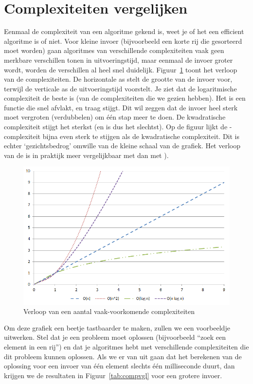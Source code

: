 \section{Complexiteiten vergelijken}

Eenmaal de complexiteit van een algoritme gekend is, weet je of het een efficient algoritme is of niet. Voor kleine invoer (bijvoorbeeld een korte rij die gesorteerd moet worden) gaan algoritmes van verschillende complexiteiten vaak geen merkbare verschillen tonen in uitvoeringstijd, maar eenmaal de invoer groter wordt, worden de verschillen al heel snel duidelijk. Figuur~\ref{fig:complexities} toont het verloop van de complexiteiten. De horizontale as stelt de grootte van de invoer voor, terwijl de verticale as de uitvoeringstijd voorstelt. Je ziet dat de logaritmische complexiteit de beste is (van de complexiteiten die we gezien hebben). Het is een functie die snel afvlakt, en traag stijgt. Dit wil zeggen dat de invoer heel sterk moet vergroten (verdubbelen) om \'e\'en stap meer te doen. De kwadratische complexiteit stijgt het sterkst (en is dus het slechtst). Op de figuur lijkt de \compnln-complexiteit bijna even sterk te stijgen als de kwadratische complexiteit. Dit is echter `gezichtsbedrog' omwille van de kleine schaal van de grafiek. Het verloop van de \compnln is in praktijk meer vergelijkbaar met \compn dan met \compnk).

\begin{figure}
\centering
\includegraphics[scale=0.65]{Complexiteit/complexiteiten.png}
\caption{Verloop van een aantal vaak-voorkomende complexiteiten}\label{fig:complexities}
\end{figure}

Om deze grafiek een beetje tastbaarder te maken, zullen we een voorbeeldje uitwerken. Stel dat je een probleem moet oplossen (bijvoorbeeld ``zoek een element in een rij'') en dat je algoritmes hebt met verschillende complexiteiten die dit probleem kunnen oplossen. Als we er van uit gaan dat het berekenen van de oplossing voor een invoer van \'e\'en element slechts \'e\'en milliseconde duurt, dan krijgen we de resultaten in Figuur~\ref{tab:compvgl} voor een grotere invoer.

